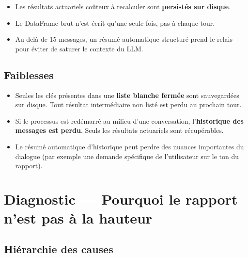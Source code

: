 \documentclass[12pt,a4paper]{article}
\begin{document}
\begin{forcebox}
\begin{itemize}[leftmargin=1.5em]
  \item Les résultats actuariels coûteux à recalculer sont \textbf{persistés sur disque}.
  \item Le DataFrame brut n'est écrit qu'une seule fois, pas à chaque tour.
  \item Au-delà de 15 messages, un résumé automatique structuré prend le relais
        pour éviter de saturer le contexte du LLM.
\end{itemize}
\end{forcebox}

\subsection{Faiblesses}

\begin{weaknessbox}
\begin{itemize}[leftmargin=1.5em]
  \item Seules les clés présentes dans une \textbf{liste blanche fermée} sont sauvegardées
        sur disque. Tout résultat intermédiaire non listé est perdu au prochain tour.
  \item Si le processus est redémarré au milieu d'une conversation, l'\textbf{historique
        des messages est perdu}. Seuls les résultats actuariels sont récupérables.
  \item Le résumé automatique d'historique peut perdre des nuances importantes du dialogue
        (par exemple une demande spécifique de l'utilisateur sur le ton du rapport).
\end{itemize}
\end{weaknessbox}

\newpage

\section{Diagnostic — Pourquoi le rapport n'est pas à la hauteur}

\subsection{Hiérarchie des causes}
\end{document}
